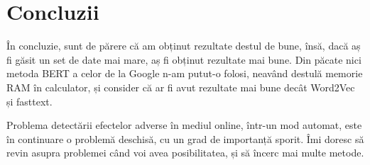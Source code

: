 \chapter*{Concluzii} 

În concluzie, sunt de părere că am obținut rezultate destul de bune, însă, dacă aș fi găsit un set de 
date mai mare, aș fi obținut rezultate mai bune. Din păcate nici metoda BERT a celor de la Google n-am
putut-o folosi, neavând destulă memorie RAM în calculator, și consider că ar fi avut rezultate mai bune
decât Word2Vec și fasttext.

Problema detectării efectelor adverse în mediul online, într-un mod automat, este în continuare o problemă
deschisă, cu un grad de importanță sporit. Îmi doresc să revin asupra problemei când voi avea posibilitatea,
și să încerc mai multe metode.